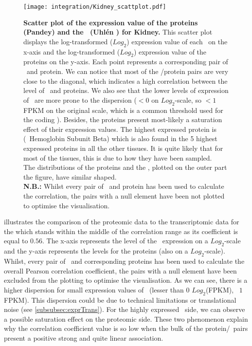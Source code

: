 \begin{figure}[!htbp]
    \texttt{[image: integration/Kidney\_scattplot.pdf]}\centering
    \caption[Scatter plot of the expression value of the proteins (Pandey)
    and the \mRNAs\ (Uhlén \etal) for Kidney]
    {\label{fig:ScatKid}\textbf{Scatter plot of the expression value of the
    proteins (Pandey) and the \mRNAs\ (Uhlén \etal) for Kidney.}
    This scatter plot displays the
    log-transformed ($Log_{2}$) expression value of
    each \mRNA\ on the x-axis and the log-transformed ($Log_{2}$)
    expression value of the proteins on the
    y-axis. Each point represents a corresponding pair of \mRNA\ and protein.
    We can notice that most of the \mRNA/protein pairs are very close to
    the diagonal, which indicates a high correlation between the level
    of \mRNAs\ and proteins. We also see that the lower levels of expression of
    \mRNAs\ are more prone to the dispersion ($<0$ on $Log_{2}$-scale, so $<1$
    \gls{FPKM} on the original scale, which is a common threshold used for the
    coding \mRNAs). Besides, the proteins present most-likely a
    saturation effect of their expression values. The highest expressed protein
    is 
    (\ie\ Hemoglobin Subunit Beta) which is also found in the 5 highest
    expressed proteins in all the other tissues. It is quite likely that for
    most of the tissues, this is due to how they have been sampled.
    \\The distributions of the proteins and the \mRNAs, plotted on the outer part
    the figure, have similar shaped.\\
    \textbf{N.B.:} Whilst every pair of \mRNA\ and protein has been used to
    calculate the correlation, the pairs with a null element have been not plotted
    to optimise the visualisation.}
\end{figure}

 illustrates the comparison of the proteomic data to the
transcriptomic data for the  which stands within the middle of the
correlation range as its coefficient is equal to $0.56$.
The x-axis represents the level of the \mRNAs\
expression on a $Log_{2}$-scale and the y-axis represents the levels for the
proteins (also on a $Log_{2}$-scale). Whilst, every pair of \mRNA\ and
corresponding proteins has been used to calculate the overall Pearson correlation
coefficient, the pairs with a null element have been excluded from the plotting
to optimise the visualisation. As we can see, there is a higher dispersion for
small expression values of \mRNAs\ (lesser than $0$ $Log_{2}$(FPKM), \ie\
$1$ FPKM). This dispersion could be due to technical limitations or translational
noise (see \cref{subsubsec:exprTrans}). For the highly expressed \mRNAs\ side,
we can observe a possible saturation effect on the proteomic side. These two
phenomenon explain why the correlation coefficient value is so low when the
bulk of the protein/\mRNA\ pairs present a positive strong and quite linear
association.

